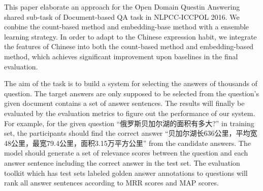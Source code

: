 \documentclass{llncs}
\begin{document}
This paper elaborate an approach for the Open Domain Questin Answering shared sub-task of Document-based QA task in NLPCC-ICCPOL 2016. We conbine the count-based method and embedding-base method with a ensemble learning strategy. In order to adapt to the Chinese expression habit, we integrate the features of Chinese into both the count-based method and embedding-based method, which achieves significant improvement upon baselines in the final evaluation.









The aim of the task is to build a system for selecting the answers of thousands of question. The target answers are only supposed to be selected from the question's given document contains a set of answer sentences. 
The results will finally be evaluated by the evaluation metrics to figure out the performance of our system. 
For example, for the given question ``俄罗斯贝加尔湖的面积有多大?'' in training set, the participants should find the correct answer ``贝加尔湖长636公里，平均宽48公里，最宽79.4公里，面积3.15万平方公里'' from the candidate answers. The model should generate a set of relevance scores between the question and each answer sentence including the correct answer in the test set. The evaluation toolkit which has test sets labeled golden answer annotations to questions will rank all answer sentences according to MRR scores and MAP scores. 

\end{document}
